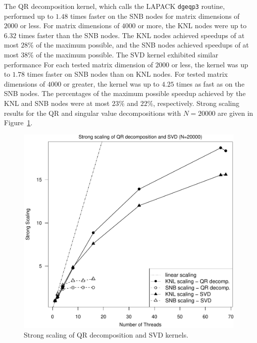The QR decomposition kernel, which calls the LAPACK \texttt{dgeqp3} routine, performed up
to $1.48$ times faster on the SNB nodes for matrix dimensions of $2000$ or less. For
matrix dimensions of $4000$ or more, the KNL nodes were up to $6.32$ times faster than the
SNB nodes. The KNL nodes achieved speedups of at most $28\%$ of the maximum possible, and
the SNB nodes achieved speedups of at most $38\%$ of the maximum possible. The SVD kernel
exhibited similar performance For each tested matrix dimension of $2000$ or less, the
kernel was up to $1.78$ times faster on SNB nodes than on KNL nodes. For tested matrix
dimensions of $4000$ or greater, the kernel was up to $4.25$ times as fast as on the SNB
nodes. The percentages of the maximum possible speedup achieved by the KNL and SNB nodes
were at most $23\%$ and $22\%$, respectively. Strong scaling results for the QR and
singular value decompositions with $N=20000$ are given in Figure~\ref{fig:qrSvdScale}.

\begin{figure}
\includegraphics[height=\columnwidth, width=\columnwidth]{qr_svd_20000_68-ss.pdf}
\caption{Strong scaling of QR decomposition and SVD kernels.}
\label{fig:qrSvdScale}
\end{figure}

